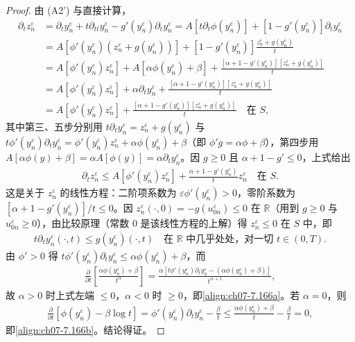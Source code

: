 \documentclass[../../main.tex]{subfiles}%
\begin{document}
\begin{proof}
由 (A2') 与直接计算，
\begin{align*}
\partial_tz_n^\varepsilon&=\partial_ty_n^\varepsilon+t\partial_{tt}y_n^\varepsilon-g'(y_n^\varepsilon)\partial_ty_n^\varepsilon
=A[t\partial_t\phi(y_n^\varepsilon)]+[1-g'(y_n^\varepsilon)]\partial_ty_n^\varepsilon\\
&=A[\phi'(y_n^\varepsilon)(z_n^\varepsilon+g(y_n^\varepsilon))]+[1-g'(y_n^\varepsilon)]\frac{z_n^\varepsilon+g(y_n^\varepsilon)}{t}\\
&=A[\phi'(y_n^\varepsilon)z_n^\varepsilon]+A[\alpha\phi(y_n^\varepsilon)+\beta]+\frac{[\alpha+1-g'(y_n^\varepsilon)][z_n^\varepsilon+g(y_n^\varepsilon)]}{t}\\
&=A[\phi'(y_n^\varepsilon)z_n^\varepsilon]+\alpha\partial_ty_n^\varepsilon+\frac{[\alpha+1-g'(y_n^\varepsilon)][z_n^\varepsilon+g(y_n^\varepsilon)]}{t}\\
&=A[\phi'(y_n^\varepsilon)z_n^\varepsilon]+\frac{[\alpha+1-g'(y_n^\varepsilon)][z_n^\varepsilon+g(y_n^\varepsilon)]}{t}\quad\text{在 }S,
\end{align*}
其中第三、五步分别用 $t\partial_ty_n^\varepsilon=z_n^\varepsilon+g(y_n^\varepsilon)$ 与 $t\phi'(y_n^\varepsilon)\partial_ty_n^\varepsilon=\phi'(y_n^\varepsilon)z_n^\varepsilon+\alpha\phi(y_n^\varepsilon)+\beta$（即 $\phi'g=\alpha\phi+\beta$），第四步用 $A[\alpha\phi(y)+\beta]=\alpha A[\phi(y)]=\alpha\partial_ty_n^\varepsilon$。因 $g\geqslant0$ 且 $\alpha+1-g'\leqslant0$，上式给出
\begin{align*}
\partial_tz_n^\varepsilon\leqslant A[\phi'(y_n^\varepsilon)z_n^\varepsilon]+\frac{\alpha+1-g'(y_n^\varepsilon)}{t}z_n^\varepsilon\quad\text{在 }S .
\end{align*}
这是关于 $z_n^\varepsilon$ 的线性方程：二阶项系数为 $\varepsilon\phi'(y_n^\varepsilon)>0$，零阶系数为 $[\alpha+1-g'(y_n^\varepsilon)]/t\leqslant0$。因 $z_n^\varepsilon(\cdot,0)=-g(u_{0n}^\varepsilon)\leqslant0$ 在 $\mathbb{R}$（用到 $g\geqslant0$ 与 $u_{0n}^\varepsilon\geqslant0$），由比较原理（常数 $0$ 是该线性方程的上解）得 $z_n^\varepsilon\leqslant0$ 在 $S$ 中，即
\begin{align*}
t\partial_ty_n^\varepsilon(\cdot,t)\leqslant g(y_n^\varepsilon)(\cdot,t)\quad\text{在 }\mathbb{R}\text{ 中几乎处处，对一切 }t\in(0,T).
\end{align*}
由 $\phi'>0$ 得 $t\phi'(y_n^\varepsilon)\partial_ty_n^\varepsilon\leqslant\alpha\phi(y_n^\varepsilon)+\beta$，而
\begin{align*}
\frac{\partial}{\partial t}\left[\frac{\alpha\phi(y_n^\varepsilon)+\beta}{t^\alpha}\right]=\frac{\alpha\left[t\phi'(y_n^\varepsilon)\partial_ty_n^\varepsilon-(\alpha\phi(y_n^\varepsilon)+\beta)\right]}{t^{\alpha+1}},
\end{align*}
故 $\alpha>0$ 时上式左端 $\leqslant0$，$\alpha<0$ 时 $\geqslant0$，即\eqref{align:ch07-7.166a}。若 $\alpha=0$，则
\begin{align*}
\frac{\partial}{\partial t}[\phi(y_n^\varepsilon)-\beta\log t]=\phi'(y_n^\varepsilon)\partial_ty_n^\varepsilon-\frac{\beta}{t}\leqslant\frac{\alpha\phi(y_n^\varepsilon)+\beta}{t}-\frac{\beta}{t}=0,
\end{align*}
即\eqref{align:ch07-7.166b}。结论得证。
\end{proof}
\end{document}

